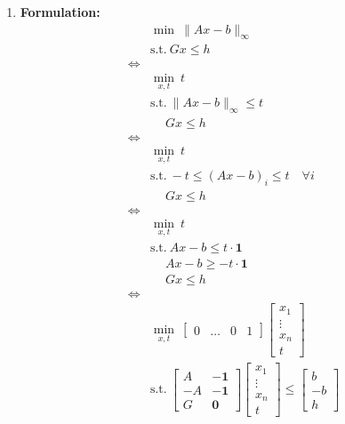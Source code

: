 \begin{example}
\begin{enumerate}
        \item \textbf{Formulation:}
        \begin{align*}
            &\min \ \|Ax - b\|_\infty \\
            &\text{s.t.} \ Gx \leq h \\
            \iff & \\
            &\min_{x, t} \ t \\
            &\text{s.t.} \ \|Ax - b\|_\infty \leq t \\
            &\ \quad Gx \leq h \\
            \iff & \\
            &\min_{x, t} \ t \\
            &\text{s.t.} \ -t \leq (Ax - b)_i \leq t \quad \forall i \\
            &\ \quad Gx \leq h \\
            \iff & \\
            &\min_{x, t} \ t \\
            &\text{s.t.} \ Ax - b \leq t \cdot \mathbf{1} \\
            &\ \quad Ax - b \geq -t \cdot \mathbf{1} \\
            &\ \quad Gx \leq h \\
            \iff & \\
            &\min_{x, t} \ \begin{bmatrix} 0 & \dots & 0 & 1 \end{bmatrix}
            \begin{bmatrix} x_1 \\ \vdots \\ x_n \\ t \end{bmatrix} \\
            &\text{s.t.} \ \begin{bmatrix} A & \mathbf{-1}\\ -A & \mathbf{-1} \\ G & \mathbf{0} \end{bmatrix}
            \begin{bmatrix} x_1 \\ \vdots \\ x_n \\ t \end{bmatrix}
            \leq \begin{bmatrix} b \\ -b \\ h \end{bmatrix}
        \end{align*}
    \end{enumerate}
\end{example}

